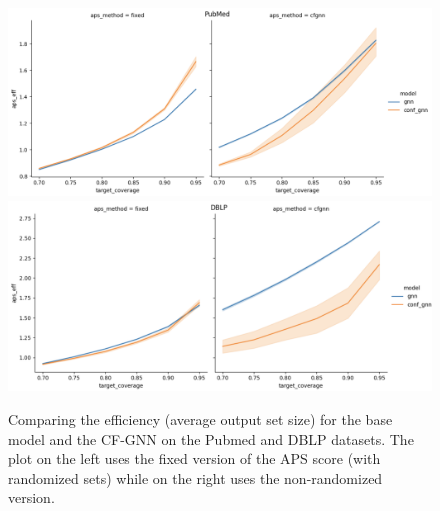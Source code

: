 \begin{figure}
    \centering
    \includegraphics[width=0.7\linewidth]{graphConformal/figures/PubMed_CF.png}
    \includegraphics[width=0.7\linewidth]{graphConformal/figures/DBLP_CF.png}
    \caption{Comparing the efficiency (average output set size) for the base model and the CF-GNN on the Pubmed and DBLP datasets. The plot on the left uses the fixed version of the APS score (with randomized sets) while on the right uses the non-randomized version.}
    \label{fig:CFGNN:preliminary}
\end{figure}
